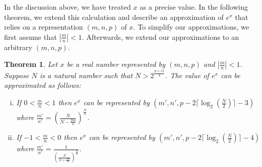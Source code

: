 \documentclass{article}
\newtheorem{mytheorem}{Theorem}
\numberwithin{mytheorem}{section}
\begin{document}
In the discussion above, we have treated $x$ as a precise value. In the following theorem, we extend this calculation and describe an approximation of $e^x$ that relies on a representation $(m,n,p)$ of $x$. To simplify our approximations, we first assume that $|\frac{m}{n}|<1$. Afterwards, we extend our approximations to an arbitrary $(m,n,p)$.
\begin{mytheorem}\label{thm:base_exp}
Let $x$ be a real number represented by $(m,n,p)$ and $|\frac{m}{n}|<1$. Suppose $N$ is a natural number such that $N>2^{\frac{p+11}{3}}$. The value of $e^x$ can be approximated as follows:
\begin{enumerate}[i.]
\item \label{thm:base_exp_1}
If $0<\frac{m}{n}<1$ then $e^x$ can be represented by $(m',n',p-2\lceil\log_2(\frac{N}{2}) \rceil-3)$ where $\frac{m'}{n'}=(\frac{N}{N-\frac{2m}{n}})^{\frac{N}{2}}$.
\item \label{thm:base_exp_2}
If $-1<\frac{m}{n}<0$ then $e^x$ can be represented by $(m',n',p-2\lceil\log_2(\frac{N}{2}) \rceil-4)$ where $\frac{m'}{n'}=\frac{1}{(\frac{N}{N+\frac{2m}{n}})^{\frac{N}{2}}}$.
\end{enumerate}
\end{mytheorem}
\end{document}
